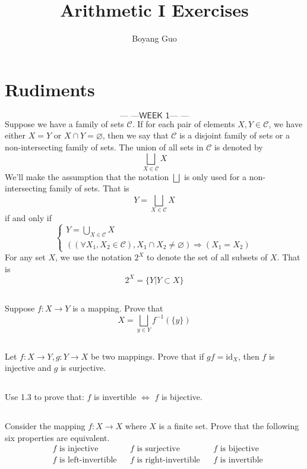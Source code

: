 \documentclass{report}
\title{\textbf{Arithmetic I Exercises}}
\author{Boyang Guo}
\newcommand{\week}[1]{$$\textsf{--- ---WEEK #1--- ---}$$}
\begin{document}
\maketitle
\setcounter{tocdepth}{0}
\tableofcontents
\chapter{Rudiments}
\week{1}
Suppose we have a family of sets $\mathcal{C}$. If for each pair of elements $X,Y\in \mathcal{C}$, we have either $X = Y$ or $X \cap Y = \varnothing$, then we say that $\mathcal{C}$ is a disjoint family of sets or a non-intersecting family of sets. The union of all sets in $\mathcal{C}$ is denoted by
$$\bigsqcup_{X \in \mathcal{C}} X$$
We'll make the assumption that the notation $\bigsqcup$ is only used for a non-intersecting family of sets. That is
$$Y = \bigsqcup_{X \in \mathcal{C}} X$$
if and only if
$$
\begin{cases}
Y = \bigcup_{X \in \mathcal{C}} X\\
((\forall X_1,X_2 \in \mathcal{C}),X_1\cap X_2 \neq \varnothing) \Rightarrow (X_1=X_2)
\end{cases}
$$
For any set $X$, we use the notation $2^X$ to denote the set of all subsets of $X$. That is
$$2^X = \{Y|Y \subset X\}$$
\section{}
Suppose $f:X\rightarrow Y$ is a mapping. Prove that
$$X=\bigsqcup_{y\in Y} f^{-1}(\{y\})$$
\section{}
Let $f:X\rightarrow Y,g:Y\rightarrow X$ be two mappings. Prove that if $gf=\text{id}_X$, then $f$ is injective and $g$ is surjective. 
\section{}
Use 1.3 to prove that: $f$ is invertible $\Leftrightarrow$ $ f$ is bijective. 
\section{}
Consider the mapping $f:X\rightarrow X$ where $X$ is a finite set. Prove that the following six properties are equivalent.
\begin{align*}
&f\text{ is injective } &&f\text{ is surjective } &&f\text{ is bijective}\\
&f\text{ is left-invertible} &&f\text{ is right-invertible} &&f\text{ is invertible}
\end{align*}
\end{document}
